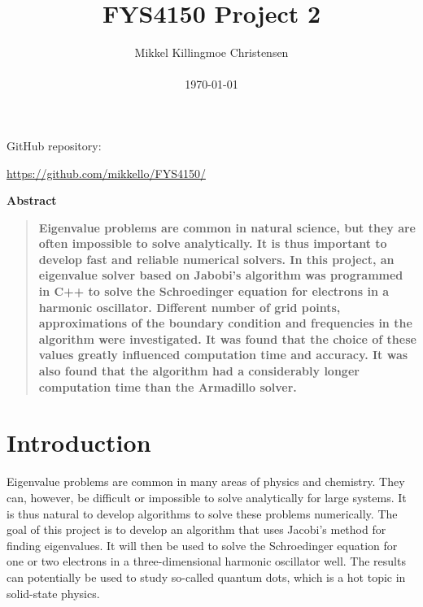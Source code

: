 \documentclass[10pt,a4paper,titlepage]{article}
\title{FYS4150 Project 2}
\author
{Mikkel Killingmoe Christensen\\
\\
\normalsize{\today}
}
\date{}
\newenvironment{sciabstract}{%
\begin{quote} \bf}
{\end{quote}}
\begin{document}
 


\baselineskip24pt


\maketitle 
\begin{center}
\par GitHub repository:
\par \url{https://github.com/mikkello/FYS4150/}
\end{center}



\begin{center}
{\large \textbf{Abstract}}
\end{center}
\begin{sciabstract}
Eigenvalue problems are common in natural science, but they are often impossible to solve analytically. It is thus important to develop fast and reliable numerical solvers. In this project, an eigenvalue solver based on Jabobi's algorithm was programmed in C++ to solve the Schroedinger equation for electrons in a harmonic oscillator. Different number of grid points, approximations of the boundary condition and frequencies in the algorithm were investigated. It was found that the choice of these values greatly influenced computation time and accuracy. It was also found that the algorithm had a considerably longer computation time than the Armadillo solver.  
\end{sciabstract}



\section{Introduction}
Eigenvalue problems are common in many areas of physics and chemistry. They can, however, be difficult or impossible to solve analytically for large systems. It is thus natural to develop algorithms to solve these problems numerically. The goal of this project is to develop an algorithm that uses Jacobi's method for finding eigenvalues. It will then be used to solve the Schroedinger equation for one or two electrons in a three-dimensional harmonic oscillator well. The results can potentially be used to study so-called quantum dots, which is a hot topic in solid-state physics.
\end{document}
